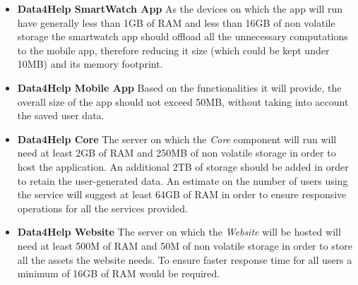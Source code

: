 \begin{itemize}
    \item \textbf{Data4Help SmartWatch App} As the devices on which the app will run have generally less than 1GB of RAM and less than 16GB of non volatile storage the smartwatch app should offload all the unnecessary computations to the mobile app, therefore reducing it size (which could be kept under 10MB) and its memory footprint.
    \item \textbf{Data4Help Mobile App} Based on the functionalities it will provide, the overall size of the app should not exceed 50MB, without taking into account the saved user data.
    \item \textbf{Data4Help Core} The server on which the \textit{Core} component will run will need at least 2GB of RAM and 250MB of non volatile storage in order to host the application. An additional 2TB of storage should be added in order to retain the user-generated data. \newline An estimate on the number of users using the service will suggest at least 64GB of RAM in order to ensure responsive operations for all the services provided.
    \item \textbf{Data4Help Website} The server on which the \textit{Website} will be hosted will need at least 500M of RAM and 50M of non volatile storage in order to store all the assets the website needs.
    To ensure faster response time for all users a minimum of 16GB of RAM would be required.
    
\end{itemize}


